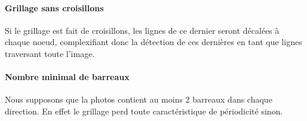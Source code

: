 \paragraph{Grillage sans croisillons}
Si le grillage est fait de croisillons, les lignes de ce dernier seront décalées à chaque noeud, complexifiant donc la détection de ces dernières en tant que lignes traversant toute l'image.

\paragraph{Nombre minimal de barreaux}
Nous supposons que la photos contient au moins 2 barreaux dans chaque direction. En effet le grillage perd toute caractéristique de périodicité sinon.